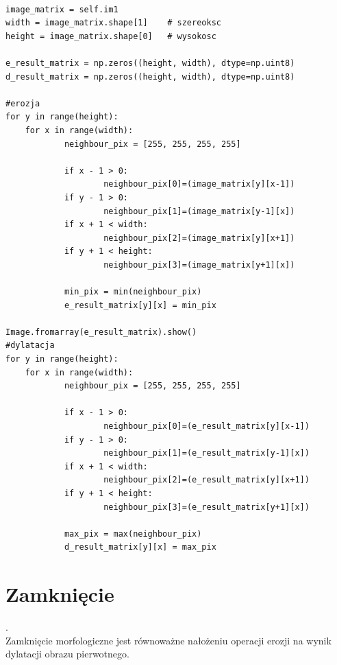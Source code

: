 \documentclass[final,a4paper,openany,12pt]{mwbk}
\begin{document}
\begin{lstlisting}[caption= Operacja otwarcia na obrazie szarym]

image_matrix = self.im1
width = image_matrix.shape[1]    # szereoksc
height = image_matrix.shape[0]   # wysokosc

e_result_matrix = np.zeros((height, width), dtype=np.uint8)
d_result_matrix = np.zeros((height, width), dtype=np.uint8)

#erozja
for y in range(height):
    for x in range(width):  
            neighbour_pix = [255, 255, 255, 255]

            if x - 1 > 0:
                    neighbour_pix[0]=(image_matrix[y][x-1])
            if y - 1 > 0:
                    neighbour_pix[1]=(image_matrix[y-1][x])
            if x + 1 < width:
                    neighbour_pix[2]=(image_matrix[y][x+1])
            if y + 1 < height:
                    neighbour_pix[3]=(image_matrix[y+1][x])

            min_pix = min(neighbour_pix)
            e_result_matrix[y][x] = min_pix

Image.fromarray(e_result_matrix).show()
#dylatacja
for y in range(height):
    for x in range(width):  
            neighbour_pix = [255, 255, 255, 255]

            if x - 1 > 0:
                    neighbour_pix[0]=(e_result_matrix[y][x-1])
            if y - 1 > 0:
                    neighbour_pix[1]=(e_result_matrix[y-1][x])
            if x + 1 < width:
                    neighbour_pix[2]=(e_result_matrix[y][x+1])
            if y + 1 < height:
                    neighbour_pix[3]=(e_result_matrix[y+1][x])

            max_pix = max(neighbour_pix)
            d_result_matrix[y][x] = max_pix    

\end{lstlisting}
\newpage

\section{ Zamknięcie}
.\hfill\\
\indent
	Zamknięcie morfologiczne jest równoważne nałożeniu operacji erozji na wynik dylatacji obrazu pierwotnego.
\end{document}

